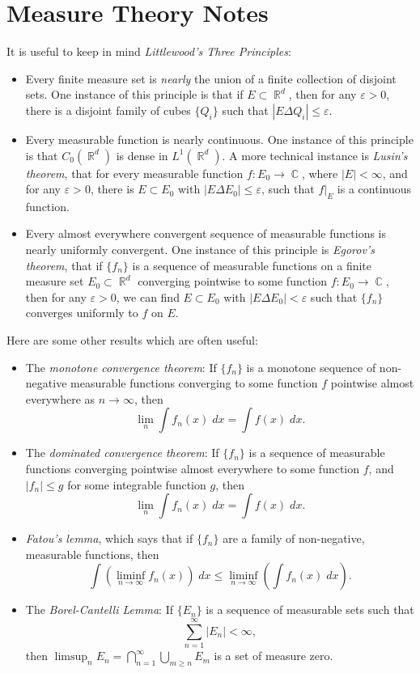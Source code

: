 \documentclass[answers]{exam}
\DeclareMathOperator{\CC}{\mathbb{C}}
\DeclareMathOperator{\RR}{\mathbb{R}}
\theoremstyle{problemstyle}
\newcommand{\1}[1]{\textbf{1}_{\left[#1\right]}} %
\begin{document}
\newpage
\section{Measure Theory Notes}

It is useful to keep in mind \emph{Littlewood's Three Principles}:
%
\begin{itemize}
	\item Every finite measure set is \emph{nearly} the union of a finite collection of disjoint sets. One instance of this principle is that if $E \subset \RR^d$, then for any $\varepsilon > 0$, there is a disjoint family of cubes $\{ Q_i \}$ such that $|E \Delta Q_i| \leq \varepsilon$.

	\item Every measurable function is nearly continuous. One instance of this principle is that $C_0(\RR^d)$ is dense in $L^1(\RR^d)$. A more technical instance is \emph{Lusin's theorem}, that for every measurable function $f: E_0 \to \CC$, where $|E| < \infty$, and for any $\varepsilon > 0$, there is $E \subset E_0$ with $|E \Delta E_0| \leq \varepsilon$, such that $f|_E$ is a continuous function.

	\item Every almost everywhere convergent sequence of measurable functions is nearly uniformly convergent. One instance of this principle is \emph{Egorov's theorem}, that if $\{ f_n \}$ is a sequence of measurable functions on a finite measure set $E_0 \subset \RR^d$ converging pointwise to some function $f: E_0 \to \CC$, then for any $\varepsilon > 0$, we can find $E \subset E_0$ with $|E \Delta E_0| < \varepsilon$ such that $\{ f_n \}$ converges uniformly to $f$ on $E$.
\end{itemize}
%
Here are some other results which are often useful:
%
\begin{itemize}
	\item The \emph{monotone convergence theorem}: If $\{ f_n \}$ is a monotone sequence of non-negative measurable functions converging to some function $f$ pointwise almost everywhere as $n \to \infty$, then
	\[ \lim_n \int f_n(x)\; dx = \int f(x)\; dx. \]

	\item The \emph{dominated convergence theorem}: If $\{ f_n \}$ is a sequence of measurable functions converging pointwise almost everywhere to some function $f$, and $|f_n| \leq g$ for some integrable function $g$, then
	\[ \lim_n \int f_n(x)\; dx = \int f(x)\; dx. \]

	\item \emph{Fatou's lemma}, which says that if $\{ f_n \}$ are a family of non-negative, measurable functions, then
	\[ \int \left( \liminf_{n \to \infty} f_n(x) \right)\; dx \leq \liminf_{n \to \infty} \left( \int f_n(x)\; dx \right). \]

	\item The \emph{Borel-Cantelli Lemma}: If $\{ E_n \}$ is a sequence of measurable sets such that
	\[ \sum_{n = 1}^\infty |E_n| < \infty, \]
	then $\limsup_n E_n = \bigcap_{n = 1}^\infty \bigcup_{m \geq n} E_m$ is a set of measure zero.
\end{itemize}
\end{document}
